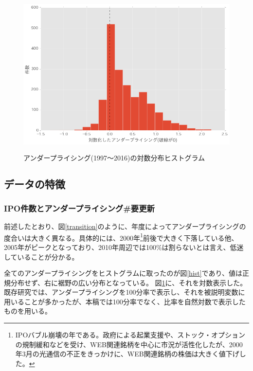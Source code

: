 \documentclass{jsarticle}
\begin{document}
\begin{figure}[!h]
  \begin{center}
  \caption{アンダープライシング(1997〜2016)の対数分布ヒストグラム}
    \includegraphics[clip,width=14cm]{./loghist.png}
    \label{loghist}
  \end{center}
\end{figure}

\newpage

\subsection{データの特徴}
\subsubsection{IPO件数とアンダープライシング\#要更新}
前述したとおり、図\ref{transition}のように、年度によってアンダープライシングの度合いは大きく異なる。具体的には、2000年\footnote[8]{IPOバブル崩壊の年である。政府による起業支援や、ストック・オプションの規制緩和などを受け、WEB関連銘柄を中心に市況が活性化したが、2000年3月の光通信の不正をきっかけに、WEB関連銘柄の株価は大きく値下げした。}前後で大きく下落している他、2005年がピークとなっており、2010年周辺では100\%は割らないとは言え、低迷していることが分かる。\par
全てのアンダープライシングをヒストグラムに取ったのが図\ref{hist}であり、値は正規分布せず、右に裾野の広い分布となっている。
図\ref{loghist}に、それを対数表示した。既存研究では、アンダープライシングを100分率で表示し、それを被説明変数に用いることが多かったが、本稿では100分率でなく、比率を自然対数で表示したものを用いる。\par
\end{document}
